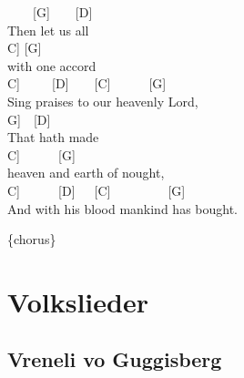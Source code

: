 \documentclass[
  letterpaper,
]{scrbook}
\begin{document}
~~~~{[}G{]}~~~~{[}D{]}\\
Then let us all\\
\hspace*{0.333em}\hspace*{0.333em}\hspace*{0.333em}\hspace*{0.333em}{[}C{]}
{[}G{]}\\
with one accord~~\\
\hspace*{0.333em}\hspace*{0.333em}\hspace*{0.333em}\hspace*{0.333em}{[}C{]}~~~~~{[}D{]}~~~~{[}C{]}~~~~~~{[}G{]}\\
Sing praises to our heavenly Lord,\\
\hspace*{0.333em}\hspace*{0.333em}\hspace*{0.333em}\hspace*{0.333em}{[}G{]}~~{[}D{]}\\
That hath made\\
\hspace*{0.333em}\hspace*{0.333em}\hspace*{0.333em}\hspace*{0.333em}\hspace*{0.333em}\hspace*{0.333em}\hspace*{0.333em}\hspace*{0.333em}\hspace*{0.333em}\hspace*{0.333em}{[}C{]}~~~~~~{[}G{]}\\
heaven and earth of nought,\\
\hspace*{0.333em}\hspace*{0.333em}\hspace*{0.333em}{[}C{]}~~~~~~{[}D{]}~~~{[}C{]}~~~~~~~~~{[}G{]}\\
And with his blood mankind has bought.

\{chorus\}

\part{Volkslieder}

\hypertarget{vreneli-vo-guggisberg}{%
\chapter{Vreneli vo Guggisberg}\label{vreneli-vo-guggisberg}}
\end{document}

